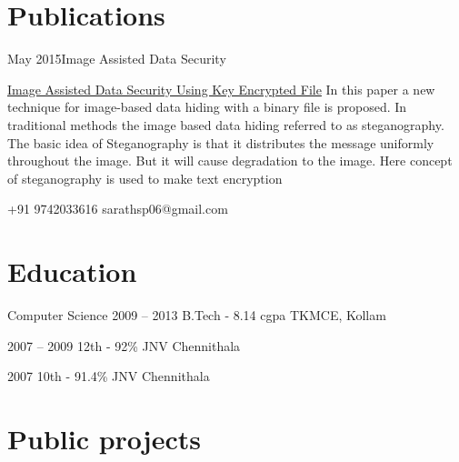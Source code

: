 \documentclass{tccv}
\begin{document}
\section{Publications}

\begin{eventlist}
\item{May 2015}{}{Image Assisted Data Security}
     
\href{http://www.ijert.org/view-pdf/13070/image-assisted-data-security-using-key-encrypted-file}{Image Assisted Data Security Using Key Encrypted File} 
In this paper a new technique for image-based data hiding with a binary file is proposed. In traditional methods the image based data hiding referred to as steganography. The basic idea of Steganography is that it distributes the message uniformly throughout the image. But it will cause degradation to the image. Here concept of steganography is used to make text encryption

\end{eventlist}


    {+91 9742033616}
    {sarathsp06@gmail.com}

\section{Education}

\begin{yearlist}

\item[Computer Science]{2009 -- 2013}
     {B.Tech - 8.14 cgpa }
     {TKMCE, Kollam }

\item{2007 -- 2009}
     {12th - 92\% }
     {JNV Chennithala}

\item{2007 }
     {10th - 91.4\% }
     {JNV Chennithala}


\end{yearlist}

 \section{Public projects}
\end{document}
